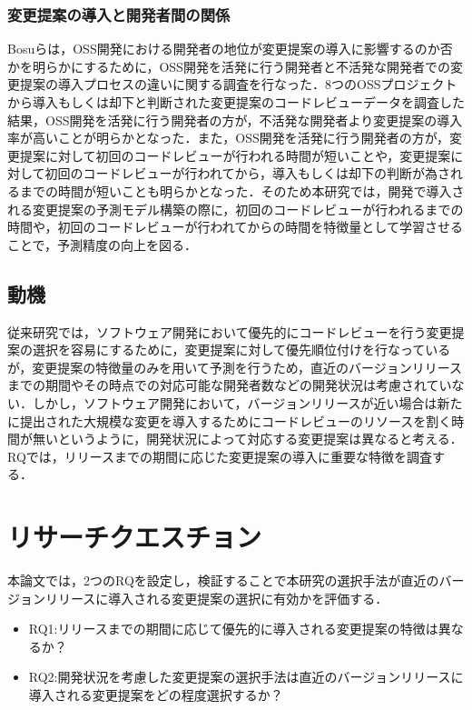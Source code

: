 \documentclass[submit,ses,noauthor]{ipsj}
\begin{document}
\subsubsection{変更提案の導入と開発者間の関係}
Bosu\cite{review1}らは，OSS開発における開発者の地位が変更提案の導入に影響するのか否かを明らかにするために，OSS開発を活発に行う開発者と不活発な開発者での変更提案の導入プロセスの違いに関する調査を行なった．8つのOSSプロジェクトから導入もしくは却下と判断された変更提案のコードレビューデータを調査した結果，OSS開発を活発に行う開発者の方が，不活発な開発者より変更提案の導入率が高いことが明らかとなった．また，OSS開発を活発に行う開発者の方が，変更提案に対して初回のコードレビューが行われる時間が短いことや，変更提案に対して初回のコードレビューが行われてから，導入もしくは却下の判断が為されるまでの時間が短いことも明らかとなった．そのため本研究では，開発で導入される変更提案の予測モデル構築の際に，初回のコードレビューが行われるまでの時間や，初回のコードレビューが行われてからの時間を特徴量として学習させることで，予測精度の向上を図る．


\subsection{動機}
従来研究\cite{prioritizer}では，ソフトウェア開発において優先的にコードレビューを行う変更提案の選択を容易にするために，変更提案に対して優先順位付けを行なっているが，変更提案の特徴量のみを用いて予測を行うため，直近のバージョンリリースまでの期間やその時点での対応可能な開発者数などの開発状況は考慮されていない．しかし，ソフトウェア開発において，バージョンリリースが近い場合は新たに提出された大規模な変更を導入するためにコードレビューのリソースを割く時間が無いというように，開発状況によって対応する変更提案は異なると考える．RQでは，リリースまでの期間に応じた変更提案の導入に重要な特徴を調査する．

\section{リサーチクエスチョン}
本論文では，2つのRQを設定し，検証することで本研究の選択手法が直近のバージョンリリースに導入される変更提案の選択に有効かを評価する．
 \begin{itemize}
  \item RQ1:リリースまでの期間に応じて優先的に導入される変更提案の特徴は異なるか？
  \item RQ2:開発状況を考慮した変更提案の選択手法は直近のバージョンリリースに導入される変更提案をどの程度選択するか？
 \end{itemize}
 
\end{document}
